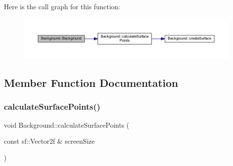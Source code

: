 Here is the call graph for this function\+:
\nopagebreak
\begin{figure}[H]
\begin{center}
\leavevmode
\includegraphics[width=350pt]{class_background_aa0ed85ded5e4336ff385b1129c9205ca_cgraph}
\end{center}
\end{figure}


\subsection{Member Function Documentation}
\mbox{\label{class_background_a7ac5e97fcf0c7f714332be76bbfd19e4}} 
\subsubsection{\texorpdfstring{calculate\+Surface\+Points()}{calculateSurfacePoints()}}
{\footnotesize\ttfamily void Background\+::calculate\+Surface\+Points (\begin{DoxyParamCaption}\item[{const sf\+::\+Vector2f \&}]{screen\+Size }\end{DoxyParamCaption})}

